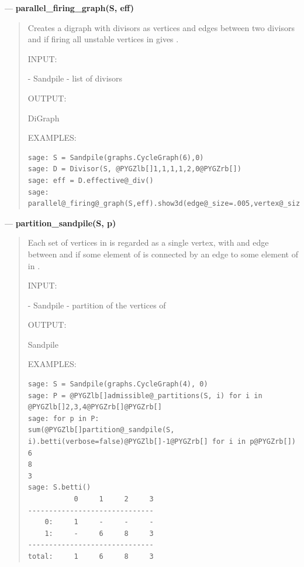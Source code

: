 \documentclass[letterpaper,10pt,english]{manual}
\begin{document}
---
\hypertarget{parallel-firing-graph-s-eff}{}
\textbf{parallel\_firing\_graph(S, eff)}
\begin{quote}

Creates a digraph with divisors as vertices and edges between two
divisors  and  if firing all unstable vertices in  gives
.

INPUT:

 - Sandpile
 - list of divisors

OUTPUT:

DiGraph

EXAMPLES:

\begin{Verbatim}[commandchars=@\[\]]
sage: S = Sandpile(graphs.CycleGraph(6),0)
sage: D = Divisor(S, @PYGZlb[]1,1,1,1,2,0@PYGZrb[])
sage: eff = D.effective@_div()
sage: parallel@_firing@_graph(S,eff).show3d(edge@_size=.005,vertex@_size=0.01)
\end{Verbatim}
\end{quote}

---
\hypertarget{partition-sandpile-s-p}{}
\textbf{partition\_sandpile(S, p)}
\begin{quote}

Each set of vertices in  is regarded as a single vertex, with and edge
between  and  if some element of  is connected by an edge
to  some element of  in .

INPUT:

 - Sandpile
 - partition of the vertices of 

OUTPUT:

Sandpile

EXAMPLES:

\begin{Verbatim}[commandchars=@\[\]]
sage: S = Sandpile(graphs.CycleGraph(4), 0)
sage: P = @PYGZlb[]admissible@_partitions(S, i) for i in @PYGZlb[]2,3,4@PYGZrb[]@PYGZrb[]
sage: for p in P:
sum(@PYGZlb[]partition@_sandpile(S, i).betti(verbose=false)@PYGZlb[]-1@PYGZrb[] for i in p@PYGZrb[])
6
8
3
sage: S.betti()
           0     1     2     3
------------------------------
    0:     1     -     -     -
    1:     -     6     8     3
------------------------------
total:     1     6     8     3
\end{Verbatim}
\end{quote}
\end{document}
